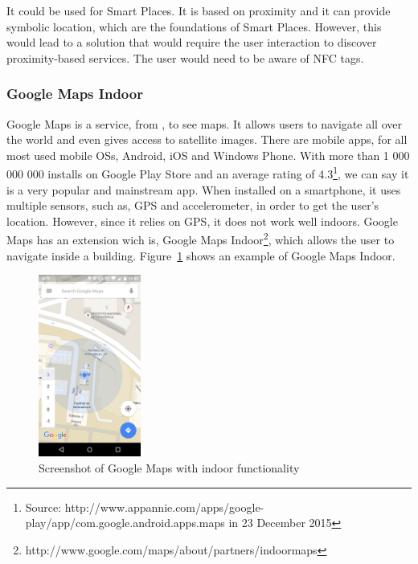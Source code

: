It could be used for Smart Places.
It is based on proximity and it can provide symbolic location, which are the foundations of Smart Places.
However, this would lead to a solution that would require the user interaction to discover proximity-based services.
The user would need to be aware of \gls{NFC} tags.

\subsubsection{Google Maps Indoor}
\label{sub:background_google_maps_indoor}
Google Maps is a service, from , to see maps.
It allows users to navigate all over the world and even gives access to satellite images.
There are mobile apps, for all most used mobile \glspl{OS}, Android, iOS and Windows Phone.
With more than 1 000 000 000 installs on Google Play Store and an average rating of 4.3\footnote{Source: http://www.appannie.com/apps/google-play/app/com.google.android.apps.maps in 23 December 2015}, we can say it is a very popular and mainstream app.
When installed on a smartphone, it uses multiple sensors, such as, \gls{GPS} and accelerometer, in order to get the user's location.
However, since it relies on \gls{GPS}, it does not work well indoors.
Google Maps has an extension wich is, Google Maps Indoor\footnote{http://www.google.com/maps/about/partners/indoormaps}, which allows the user to navigate inside a building.
Figure~\ref{fig:google_maps_indoor} shows an example of Google Maps Indoor.

\begin{figure}[!ht]
  \centering
    \includegraphics[width=0.3\textwidth, keepaspectratio]{figures/screenshots/google_maps_indoor}
    \caption[Google Maps Indoor]{Screenshot of Google Maps with indoor functionality}
    \label{fig:google_maps_indoor}
\end{figure}

